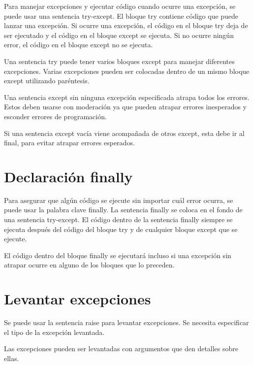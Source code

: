 \documentclass{report}
\begin{document}
Para manejar excepciones y ejecutar código cuando ocurre una excepción, se puede usar una sentencia try-except. El bloque try contiene código que puede lanzar una excepción. Si ocurre una excepción, el código en el bloque try deja de ser ejecutado y el código en el bloque except se ejecuta. Si no ocurre ningún error, el código en el bloque except no se ejecuta.


Una sentencia try puede tener varios bloques except para manejar diferentes excepciones. Varias excepciones pueden ser colocadas dentro de un mismo bloque except utilizando paréntesis.


Una sentencia except sin ninguna excepción especificada atrapa todos los errores. Estos deben usarse con moderación ya que pueden atrapar errores inesperados y esconder errores de programación.


Si una sentencia except vacía viene acompañada de otros except, esta debe ir al final, para evitar atrapar errores esperados.

\section{Declaración finally}

Para asegurar que algún código se ejecute sin importar cuál error ocurra, se puede usar la palabra clave finally. La sentencia finally se coloca en el fondo de una sentencia try-except. El código dentro de la sentencia finally siempre se ejecuta después del código del bloque try y de cualquier bloque except que se ejecute.


El código dentro del bloque finally se ejecutará incluso si una excepción sin atrapar ocurre en alguno de los bloques que lo preceden.


\section{Levantar excepciones}

Se puede usar la sentencia raise para levantar excepciones. Se necesita especificar el tipo de la excepción levantada.


Las excepciones pueden ser levantadas con argumentos que den detalles sobre ellas.
\end{document}
